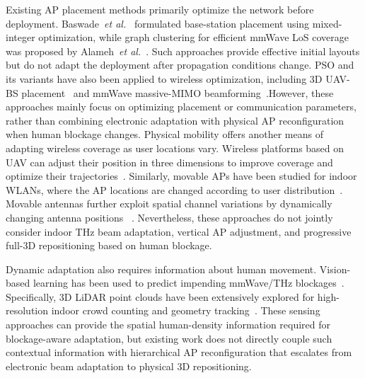 \documentclass[conference]{IEEEtran}
\begin{document}
Existing AP placement methods primarily optimize the network before
deployment. Baswade~\textit{et al.}~\cite{b4} formulated base-station
placement using mixed-integer optimization, while graph clustering for efficient mmWave LoS
coverage was proposed by Alameh~\textit{et
al.}~\cite{b7}. Such approaches provide effective initial layouts but do
not adapt the deployment after propagation conditions change. PSO and
its variants have also been applied to wireless optimization,
including 3D UAV-BS placement~\cite{b15} and mmWave massive-MIMO
beamforming~\cite{b16}.However, these approaches mainly focus on optimizing placement or communication parameters, rather than combining electronic adaptation with physical AP reconfiguration when human blockage changes.
Physical mobility offers another means of adapting wireless coverage as user locations vary. Wireless platforms based on UAV can adjust their position in three dimensions to improve coverage and optimize their trajectories~\cite{b15,b20}. Similarly, movable APs have been studied for indoor WLANs, where the AP locations are changed according to user distribution~\cite{b21}. Movable antennas further exploit spatial channel variations by dynamically changing antenna positions
~\cite{b22}. Nevertheless, these approaches do not jointly consider
indoor THz beam adaptation, vertical AP adjustment, and progressive
full-3D repositioning based on human blockage.

Dynamic adaptation also requires information about human
movement. Vision-based learning has been used to predict impending
mmWave/THz blockages~\cite{b25}.
Specifically, 3D LiDAR point clouds have been extensively explored for high-resolution indoor crowd counting and geometry tracking~\cite{b27,b29}. These sensing approaches can provide the spatial
human-density information required for blockage-aware adaptation,
but existing work does not directly couple such contextual
information with hierarchical AP reconfiguration that escalates from
electronic beam adaptation to physical 3D repositioning.


\end{document}
